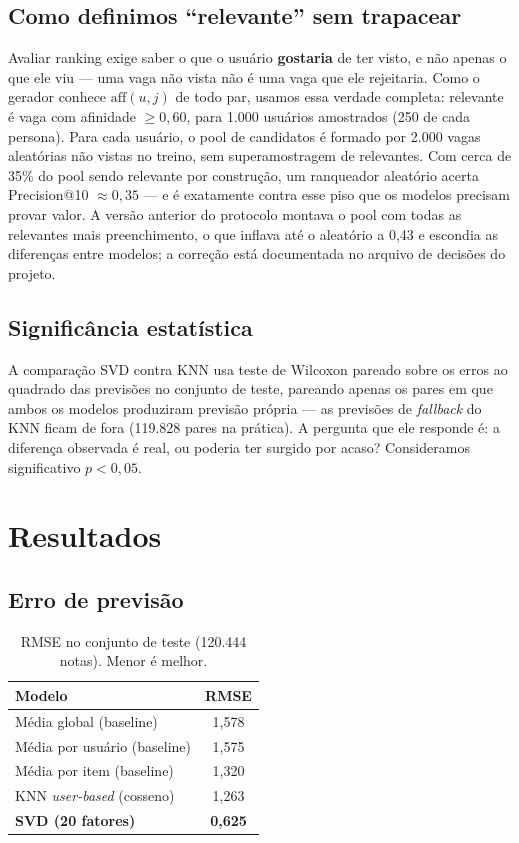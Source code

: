 \documentclass[12pt,a4paper]{article}
\begin{document}
\subsection{Como definimos ``relevante'' sem trapacear}

Avaliar ranking exige saber o que o usuário \textbf{gostaria} de ter visto, e não apenas o que ele viu --- uma vaga não vista não é uma vaga que ele rejeitaria. Como o gerador conhece $\text{aff}(u,j)$ de todo par, usamos essa verdade completa: relevante é vaga com afinidade $\geq 0{,}60$, para 1.000 usuários amostrados (250 de cada persona). Para cada usuário, o pool de candidatos é formado por 2.000 vagas aleatórias não vistas no treino, sem superamostragem de relevantes. Com cerca de 35\% do pool sendo relevante por construção, um ranqueador aleatório acerta Precision@10 $\approx 0{,}35$ --- e é exatamente contra esse piso que os modelos precisam provar valor. A versão anterior do protocolo montava o pool com todas as relevantes mais preenchimento, o que inflava até o aleatório a 0,43 e escondia as diferenças entre modelos; a correção está documentada no arquivo de decisões do projeto.

\subsection{Significância estatística}

A comparação SVD contra KNN usa teste de Wilcoxon pareado \cite{wilcoxon} sobre os erros ao quadrado das previsões no conjunto de teste, pareando apenas os pares em que ambos os modelos produziram previsão própria --- as previsões de \textit{fallback} do KNN ficam de fora (119.828 pares na prática). A pergunta que ele responde é: a diferença observada é real, ou poderia ter surgido por acaso? Consideramos significativo $p < 0{,}05$.

\section{Resultados}\label{sec:resultados}

\subsection{Erro de previsão}

\begin{table}[H]
\centering
\caption{RMSE no conjunto de teste (120.444 notas). Menor é melhor.}
\begin{tabular}{lc}
\toprule
\textbf{Modelo} & \textbf{RMSE} \\
\midrule
Média global (baseline) & 1,578 \\
Média por usuário (baseline) & 1,575 \\
Média por item (baseline) & 1,320 \\
KNN \textit{user-based} (cosseno) & 1,263 \\
\textbf{SVD (20 fatores)} & \textbf{0,625} \\
\bottomrule
\end{tabular}
\end{table}
\end{document}
